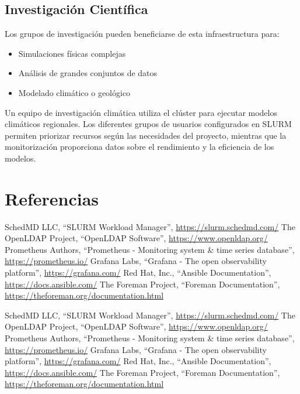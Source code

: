 \documentclass[12pt,a4paper]{article}
\begin{document}
\subsection{Investigación Científica}

Los grupos de investigación pueden beneficiarse de esta infraestructura para:

\begin{itemize}
    \item Simulaciones físicas complejas
    \item Análisis de grandes conjuntos de datos
    \item Modelado climático o geológico
\end{itemize}

\begin{infobox}
Un equipo de investigación climática utiliza el clúster para ejecutar modelos climáticos regionales. Los diferentes grupos de usuarios configurados en SLURM permiten priorizar recursos según las necesidades del proyecto, mientras que la monitorización proporciona datos sobre el rendimiento y la eficiencia de los modelos.
\end{infobox}

\section{Referencias}

\begin{thebibliography}{9}
     SchedMD LLC, ``SLURM Workload Manager'', \url{https://slurm.schedmd.com/}
     The OpenLDAP Project, ``OpenLDAP Software'', \url{https://www.openldap.org/}
     Prometheus Authors, ``Prometheus - Monitoring system \& time series database'', \url{https://prometheus.io/}
     Grafana Labs, ``Grafana - The open observability platform'', \url{https://grafana.com/}
     Red Hat, Inc., ``Ansible Documentation'', \url{https://docs.ansible.com/}
     The Foreman Project, ``Foreman Documentation'', \url{https://theforeman.org/documentation.html}
\end{thebibliography}

\begin{thebibliography}{9}
     SchedMD LLC, ``SLURM Workload Manager'', \url{https://slurm.schedmd.com/}
     The OpenLDAP Project, ``OpenLDAP Software'', \url{https://www.openldap.org/}
     Prometheus Authors, ``Prometheus - Monitoring system \& time series database'', \url{https://prometheus.io/}
     Grafana Labs, ``Grafana - The open observability platform'', \url{https://grafana.com/}
     Red Hat, Inc., ``Ansible Documentation'', \url{https://docs.ansible.com/}
     The Foreman Project, ``Foreman Documentation'', \url{https://theforeman.org/documentation.html}
\end{thebibliography}
\end{document}
